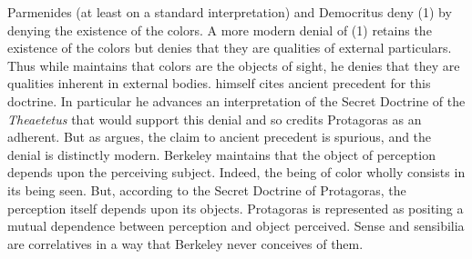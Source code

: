 Parmenides (at least on a standard interpretation) and Democritus deny (1) by denying the existence of the colors. A more modern denial of (1) retains the existence of the colors but denies that they are qualities of external particulars. Thus while \citet{Berkeley:1734fk} maintains that colors are the objects of sight, he denies that they are qualities inherent in external bodies. \citet{Berkeley:1744rm} himself cites ancient precedent for this doctrine. In particular he advances an interpretation of the Secret Doctrine of the \emph{Theaetetus} that would support this denial and so credits Protagoras as an adherent. But as \citet{Burnyeat:1982mz} argues, the claim to ancient precedent is spurious, and the denial is distinctly modern. Berkeley maintains that the object of perception depends upon the perceiving subject. Indeed, the being of color wholly consists in its being seen. But, according to the Secret Doctrine of Protagoras, the perception itself depends upon its objects. Protagoras is represented as positing a mutual dependence between perception and object perceived. Sense and sensibilia are correlatives in a way that Berkeley never conceives of them.

